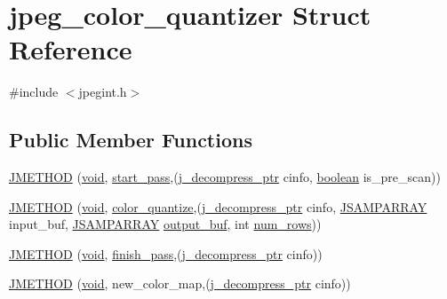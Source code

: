 \hypertarget{structjpeg__color__quantizer}{}\section{jpeg\+\_\+color\+\_\+quantizer Struct Reference}
\label{structjpeg__color__quantizer}


{\ttfamily \#include $<$jpegint.\+h$>$}

\subsection*{Public Member Functions}
\begin{DoxyCompactItemize}
\item 
\hyperlink{structjpeg__color__quantizer_a3296d9d04a267c50808154ce6bdcef1b}{J\+M\+E\+T\+H\+O\+D} (\hyperlink{png_8h_aa8c59027f9ab2769342f248709d68d17}{void}, \hyperlink{jddctmgr_8c_a1964f006adb8fb80f57e455f6452aec1}{start\+\_\+pass},(\hyperlink{jpeglib_8h_a00c7d78af44bd26a901c791ccfc1e178}{j\+\_\+decompress\+\_\+ptr} cinfo, \hyperlink{jmorecfg_8h_a7c6368b321bd9acd0149b030bb8275ed}{boolean} is\+\_\+pre\+\_\+scan))
\item 
\hyperlink{structjpeg__color__quantizer_ac11184c8e0fdc9c0ec200c0fab197b5f}{J\+M\+E\+T\+H\+O\+D} (\hyperlink{png_8h_aa8c59027f9ab2769342f248709d68d17}{void}, \hyperlink{jquant1_8c_a7cd0ab37d067e082d52761a72a34f393}{color\+\_\+quantize},(\hyperlink{jpeglib_8h_a00c7d78af44bd26a901c791ccfc1e178}{j\+\_\+decompress\+\_\+ptr} cinfo, \hyperlink{jpeglib_8h_ac9d5d1b829ed51769db69a37271a7e91}{J\+S\+A\+M\+P\+A\+R\+R\+A\+Y} input\+\_\+buf, \hyperlink{jpeglib_8h_ac9d5d1b829ed51769db69a37271a7e91}{J\+S\+A\+M\+P\+A\+R\+R\+A\+Y} \hyperlink{jdct_8h_ad7e4660a191b1a791748dd44d5a7a0ec}{output\+\_\+buf}, int \hyperlink{jpegint_8h_ac5f8b57092da0f421713ba171c4c9f87}{num\+\_\+rows}))
\item 
\hyperlink{structjpeg__color__quantizer_abb5268c27447bc9ae1876c5fffa94081}{J\+M\+E\+T\+H\+O\+D} (\hyperlink{png_8h_aa8c59027f9ab2769342f248709d68d17}{void}, \hyperlink{jdarith_8c_a51cf466731c95bff0e472f382544d8c6}{finish\+\_\+pass},(\hyperlink{jpeglib_8h_a00c7d78af44bd26a901c791ccfc1e178}{j\+\_\+decompress\+\_\+ptr} cinfo))
\item 
\hyperlink{structjpeg__color__quantizer_a9531395d8c6f914f57bea01ff2b2c5b4}{J\+M\+E\+T\+H\+O\+D} (\hyperlink{png_8h_aa8c59027f9ab2769342f248709d68d17}{void}, new\+\_\+color\+\_\+map,(\hyperlink{jpeglib_8h_a00c7d78af44bd26a901c791ccfc1e178}{j\+\_\+decompress\+\_\+ptr} cinfo))
\end{DoxyCompactItemize}


